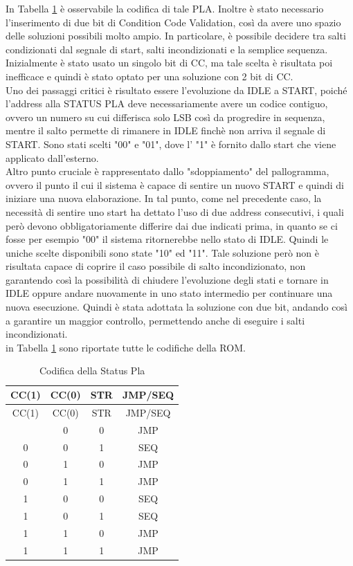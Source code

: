 \documentclass[a4paper, titlepage]{article}
\begin{document}
In Tabella \ref{tab:statuspla} è osservabile la codifica di tale PLA. Inoltre è stato necessario l'inserimento di due bit di Condition Code Validation, così da avere uno spazio delle soluzioni possibili molto ampio. In particolare, è possibile decidere tra salti condizionati dal segnale di start, salti incondizionati e la semplice sequenza.\\Inizialmente è stato usato un singolo bit di CC, ma tale scelta è risultata poi inefficace e quindi è stato optato per una soluzione con 2 bit di CC.\\Uno dei passaggi critici è risultato essere l'evoluzione da IDLE a START, poiché l'address alla STATUS PLA deve necessariamente avere un codice contiguo, ovvero un numero su cui differisca solo LSB così da progredire in sequenza, mentre il salto permette di rimanere in IDLE finchè non arriva il segnale di START. Sono stati scelti "00" e "01", dove l' "1" è fornito dallo start che viene applicato dall'esterno.\\Altro punto cruciale è rappresentato dallo "sdoppiamento" del pallogramma, ovvero il punto il cui il sistema è capace di sentire un nuovo START e quindi di iniziare una nuova elaborazione. In tal punto, come nel precedente caso, la necessità di sentire uno start ha dettato l'uso di due address consecutivi, i quali però devono obbligatoriamente differire dai due indicati prima, in quanto se ci fosse per esempio "00" il sistema ritornerebbe nello stato di IDLE. Quindi le uniche scelte disponibili sono state "10" ed "11". Tale soluzione però non è risultata capace di coprire il caso possibile di salto incondizionato, non garantendo così la possibilità di chiudere l'evoluzione degli stati e tornare in IDLE oppure andare nuovamente in uno stato intermedio per continuare una nuova esecuzione. 
\noindent Quindi è stata adottata la soluzione con due bit, andando così a garantire un maggior controllo, permettendo anche di eseguire i salti incondizionati.\\in Tabella \ref{tab:statuspla} sono riportate tutte le codifiche della ROM.\\
\begin{longtable}{*4c}
\caption{Codifica della Status Pla}\label{tab:statuspla}\\
\toprule
CC(1) & CC(0) & STR & JMP/SEQ\\
\midrule
\endfirsthead
CC(1) & CC(0) & STR &JMP/SEQ\\
\midrule
\endhead
\midrule
\endfoot
\bottomrule
\endlastfoot
0 & 0 & 0 & JMP\\
0 & 0 & 1 & SEQ\\
0 & 1 & 0 & JMP\\
0 & 1 & 1 & JMP\\
1 & 0 & 0 & SEQ\\
1 & 0 & 1 & SEQ\\
1 & 1 & 0 & JMP\\
1 & 1 & 1 & JMP\\

\end{longtable}
\end{document}
